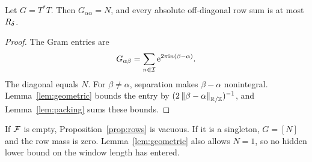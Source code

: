 \begin{proposition}\label{prop:rows}
Let $G=T^*T$.  Then $G_{\alpha\alpha}=N$, and every absolute
off-diagonal row sum is at most $R_{\delta}$.
\end{proposition}

\begin{proof}
The Gram entries are
\[
G_{\alpha\beta}
=\sum_{n\in\mathcal{I}}\mathrm{e}^{2\pi\mathrm{i} n(\beta-\alpha)}.
\]
The diagonal equals $N$.  For $\beta\neq\alpha$, separation makes
$\beta-\alpha$ nonintegral.  Lemma~\ref{lem:geometric} bounds the entry by
$(2\left\lVert \beta-\alpha\right\rVert_{\mathbb{R}/\mathbb{Z}})^{-1}$, and Lemma~\ref{lem:packing} sums these bounds.
\end{proof}

If $\mathcal{F}$ is empty, Proposition~\ref{prop:rows} is vacuous.  If it is a
singleton, $G=[N]$ and the row mass is zero.  Lemma~\ref{lem:geometric} also
allows $N=1$, so no hidden lower bound on the window length has entered.
